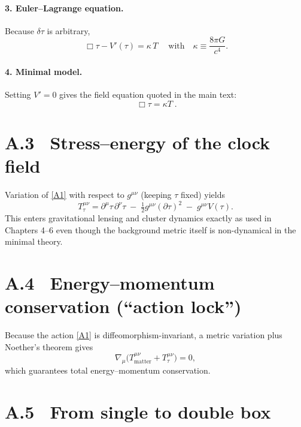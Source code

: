 \paragraph{3. Euler–Lagrange equation.}
Because \(\delta\tau\) is arbitrary,
\begin{equation}
  \boxed{\,
  \Box\tau - V'(\tau) = \kappa\,T
  \;} \quad
  \text{with}\quad
  \kappa \equiv \frac{8\pi G}{c^{4}}.
  \tag{A-4}\label{A4}
\end{equation}

\paragraph{4. Minimal model.}
Setting \(V'=0\) gives the field equation quoted in the main text:
\begin{equation}
  \boxed{\;
    \Box\tau=\kappa T
  \;} .
  \tag{A-5}\label{A5}
\end{equation}

\section*{A.3 \, Stress–energy of the clock field}

Variation of \eqref{A1} with respect to \(g^{\mu\nu}\) (keeping
\(\tau\) fixed) yields
\[
  T^{\mu\nu}_{\tau}
  = \partial^{\mu}\tau\,\partial^{\nu}\tau
   \;-\; \tfrac12 g^{\mu\nu}(\partial\tau)^{2}
   \;-\; g^{\mu\nu}V(\tau).
\]
This enters gravitational lensing and cluster dynamics exactly as used
in Chapters 4–6 even though the background metric itself is
non-dynamical in the minimal theory.

\section*{A.4 \, Energy–momentum conservation (“action lock”)}

Because the action \eqref{A1} is diffeomorphism-invariant, a metric
variation plus Noether’s theorem gives
\begin{equation}
  \nabla_{\!\mu}\bigl(T^{\mu\nu}_{\text{matter}}
                     +T^{\mu\nu}_{\tau}\bigr)=0,
  \tag{A-6}\label{A6}
\end{equation}
which guarantees total energy–momentum conservation.

\section*{A.5 \, From single to double box}

